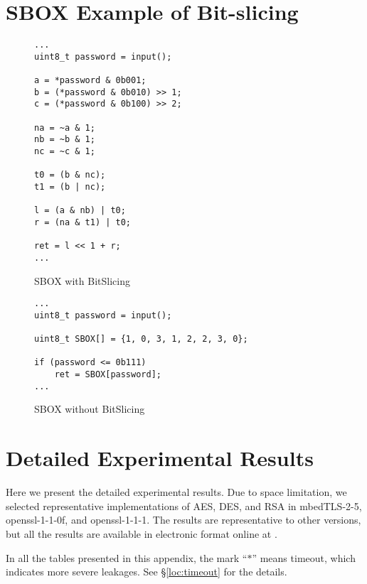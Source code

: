 \clearpage
\section{SBOX Example of Bit-slicing}
\label{appendix:SBOX}

\begin{figure}[h]
      \centering
      \begin{lstlisting}[xleftmargin=.02\textwidth,xrightmargin=.01\textwidth]
...
uint8_t password = input();

a = *password & 0b001;
b = (*password & 0b010) >> 1;
c = (*password & 0b100) >> 2;

na = ~a & 1;
nb = ~b & 1;
nc = ~c & 1;

t0 = (b & nc);
t1 = (b | nc);

l = (a & nb) | t0;
r = (na & t1) | t0;

ret = l << 1 + r;
...
      \end{lstlisting}
      \caption{SBOX with BitSlicing}
      \label{fig:SBOX_bitslicing}
\end{figure}

\begin{figure}[h]
      \centering
      \begin{lstlisting}[xleftmargin=.02\textwidth,xrightmargin=.01\textwidth]
...
uint8_t password = input();

uint8_t SBOX[] = {1, 0, 3, 1, 2, 2, 3, 0};

if (password <= 0b111)
    ret = SBOX[password];
...
      \end{lstlisting}
      \caption{SBOX without BitSlicing}
      \label{fig:SBOX_da}
\end{figure}

\section{Detailed Experimental Results}
\label{sec:result-table}

Here we present the detailed experimental results.
Due to space limitation, we selected representative implementations of
AES, DES, and RSA in
mbedTLS-2-5, 
openssl-1-1-0f,  and
openssl-1-1-1.  
The results are representative to other versions, but all the results
are available in electronic format online at .

In all the tables presented in this appendix, the mark
``$*$'' means timeout, which indicates more severe leakages.
See \S\ref{loc:timeout} for the details.

